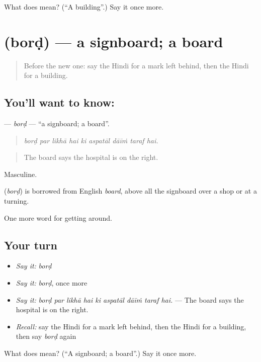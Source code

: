\begin{tcolorbox}[breakable,colback=teal!4,colframe=teal!35!black,title={Before you move on}]
What does  mean? (\textquotedblleft{}A building\textquotedblright{}.) Say it once more.
\end{tcolorbox}
\section[\texorpdfstring{\hi{बोर्ड} (borḍ)}{बोर्ड (borḍ)}]{ (borḍ) — a signboard; a board}

\label{lesson:HI-C419-bord}



\begin{quote}
Before the new one: say the Hindi for a mark left behind, then the Hindi for a building.
\end{quote}

\subsection*{You'll want to know: }
\textbf{} — \emph{borḍ} — \textquotedblleft{}a signboard; a board\textquotedblright{}.

\begin{quote}
        
\end{quote}

\begin{quote}
\emph{borḍ par likhā hai ki aspatāl dāīṁ taraf hai.}
\end{quote}

\begin{quote}
The board says the hospital is on the right.
\end{quote}

Masculine.

\begin{cousinweb}
\textbf{} (\emph{borḍ}) is borrowed from English \emph{board}, above all the signboard over a shop or at a turning.
\end{cousinweb}

\begin{grammarlens}[title={What you've built}]
One more word for getting around.
\end{grammarlens}

\subsection*{Your turn}
\begin{itemize}
\raggedright
  \item \emph{Say it:} \emph{borḍ}
  \item \emph{Say it:} \emph{borḍ}, once more
  \item \emph{Say it:} \emph{borḍ par likhā hai ki aspatāl dāīṁ taraf hai.} — The board says the hospital is on the right.
  \item \emph{Recall:} say the Hindi for a mark left behind, then the Hindi for a building, then say \emph{borḍ} again
\end{itemize}

\begin{tcolorbox}[breakable,colback=teal!4,colframe=teal!35!black,title={Before you move on}]
What does  mean? (\textquotedblleft{}A signboard; a board\textquotedblright{}.) Say it once more.
\end{tcolorbox}
